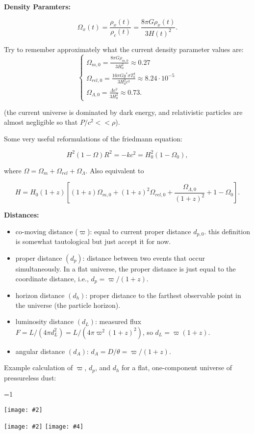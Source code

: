 \documentclass[11pt]{article}
\newcommand{\V}{

\vspace{\baselineskip}

}
\newcommand{\image}[5][1]{
\ifnum #1=1 
    \begin{center}
        \texttt{[image: \#2]}
    \end{center}
\else
    \begin{center}
        \texttt{[image: \#2]}
        \texttt{[image: \#4]}
    \end{center}
\fi
}
\begin{document}
\textbf{Density Paramters:}

\[\Omega_{x}(t) = \frac{\rho_{x}(t)}{\rho_{c}(t)} = \frac{8\pi G\rho_{x}(t)}{3H(t)^{2}}.\]

Try to remember approximately what the current density parameter values are:
\[\begin{cases}
\displaystyle \Omega_{m,0} =  \frac{8\pi G\rho_{m,0}}{3H_{0}^{2}} \approx 0.27 \\
\displaystyle \Omega_{rel,0} = \frac{16\pi Gg^{*}\sigma T_{0}^{4}}{3H_{0}^{2}c^{3}} \approx 8.24\cdot 10^{-5}\\
\displaystyle \Omega_{\Lambda,0} = \frac{\Lambda c^{2}}{3H_{0}^{2}} \approx 0.73.
\end{cases}
\]

(the current universe is dominated by dark energy, and relativistic particles are almost negligible so that $P/c^{2} << \rho$).\V

Some very useful reformulations of the friedmann equation: 

\[H^{2}(1-\Omega)R^{2} = -kc^{2} = H_{0}^{2}(1-\Omega_{0}),\]

where $\Omega = \Omega_{m} + \Omega_{rel} + \Omega_{\Lambda}$. Also equivalent to

\[H = H_{0}(1+z)\left[(1+z)\Omega_{m,0} + (1+z)^{2}\Omega_{rel,0} + \frac{\Omega_{\Lambda,0}}{(1+z)^{2}} + 1-\Omega_{0}\right].\]\V

\textbf{Distances:}

\begin{itemize}
\item co-moving distance ($\varpi$): equal to current proper distance $d_{p,0}$. this definition is somewhat tautological but just accept it for now.
\item proper distance $(d_{p})$: distance between two events that occur simultaneously. In a flat universe, the proper distance is just equal to the coordinate distance, i.e., $d_{p} = \varpi/(1+z)$.
\item horizon distance $(d_{h})$: proper distance to the farthest observable point in the universe (the particle horizon).
\item luminosity distance $(d_{L})$: measured flux $F = L/(4\pi d_{L}^{2}) = L/(4\pi \varpi^{2} (1+z)^{2})$, so $d_{L} = \varpi (1+z)$.
\item angular distance $(d_{A})$: $d_{A} = D/\theta = \varpi/(1+z)$.
\end{itemize}

Example calculation of $\varpi$, $d_{p}$, and $d_{h}$ for a flat, one-component universe of pressureless dust: 

\image[2]{images/varpi-1.png}{6}{images/varpi-2.png}{6}
\end{document}

